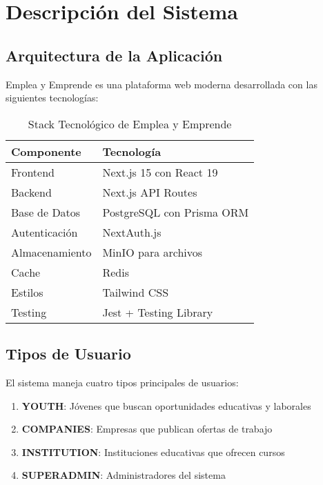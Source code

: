 \documentclass[12pt,a4paper]{article}
\begin{document}
\section{Descripción del Sistema}

\subsection{Arquitectura de la Aplicación}

Emplea y Emprende es una plataforma web moderna desarrollada con las siguientes tecnologías:

\begin{table}[H]
\centering
\caption{Stack Tecnológico de Emplea y Emprende}
\begin{tabular}{@{}ll@{}}
\toprule
\textbf{Componente} & \textbf{Tecnología} \\
\midrule
Frontend & Next.js 15 con React 19 \\
Backend & Next.js API Routes \\
Base de Datos & PostgreSQL con Prisma ORM \\
Autenticación & NextAuth.js \\
Almacenamiento & MinIO para archivos \\
Cache & Redis \\
Estilos & Tailwind CSS \\
Testing & Jest + Testing Library \\
\bottomrule
\end{tabular}
\end{table}

\subsection{Tipos de Usuario}

El sistema maneja cuatro tipos principales de usuarios:

\begin{enumerate}
    \item \textbf{YOUTH}: Jóvenes que buscan oportunidades educativas y laborales
    \item \textbf{COMPANIES}: Empresas que publican ofertas de trabajo
    \item \textbf{INSTITUTION}: Instituciones educativas que ofrecen cursos
    \item \textbf{SUPERADMIN}: Administradores del sistema
\end{enumerate}
\end{document}

